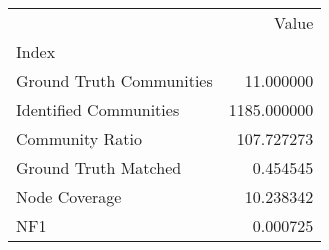 \begin{tabular}{lr}
\toprule
{} &        Value \\
Index                    &              \\
\midrule
Ground Truth Communities &    11.000000 \\
Identified Communities   &  1185.000000 \\
Community Ratio          &   107.727273 \\
Ground Truth Matched     &     0.454545 \\
Node Coverage            &    10.238342 \\
NF1                      &     0.000725 \\
\bottomrule
\end{tabular}
